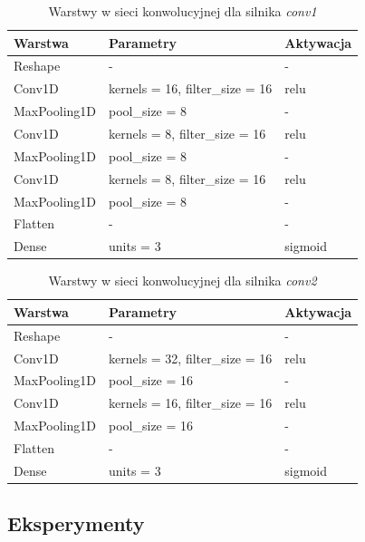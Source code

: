 \documentclass[polish,12pt]{aghthesis}
\begin{document}
\begin{table}[h!]
	\centering
\begin{tabular}{l|ll}
	Warstwa      & Parametry                       & Aktywacja \\ \hline
	Reshape      & -                               & -         \\
	Conv1D       & kernels = 16, filter\_size = 16 & relu \\
	MaxPooling1D & pool\_size = 8                  & - \\
	Conv1D       & kernels = 8, filter\_size = 16  & relu \\
	MaxPooling1D & pool\_size = 8                  & - \\
	Conv1D       & kernels = 8, filter\_size = 16  & relu \\
	MaxPooling1D & pool\_size = 8                  & - \\
	Flatten      & -                               & - \\
	Dense        & units = 3                       & sigmoid
\end{tabular}
\caption{Warstwy w sieci konwolucyjnej dla silnika \emph{conv1}}
\label{tab:conv1}
\end{table}

\begin{table}[h!]
	\centering
\begin{tabular}{l|ll}
	Warstwa      & Parametry                       & Aktywacja \\ \hline
	Reshape      & -                               & -         \\
	Conv1D       & kernels = 32, filter\_size = 16 & relu \\
	MaxPooling1D & pool\_size = 16                 & - \\
	Conv1D       & kernels = 16, filter\_size = 16 & relu \\
	MaxPooling1D & pool\_size = 16                 & - \\
	Flatten      & -                               & - \\
	Dense        & units = 3                       & sigmoid
\end{tabular}
\caption{Warstwy w sieci konwolucyjnej dla silnika \emph{conv2}}
\label{tab:conv2}
\end{table}

\subsection{Eksperymenty} \label{sec:experimental}
\end{document}
